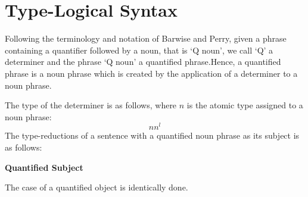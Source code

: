 \section{Type-Logical Syntax}

Following the terminology and notation of Barwise and  Perry, given a phrase containing a quantifier followed by a noun, that is `Q noun', we call `Q' a determiner and the phrase `Q noun' a quantified  phrase.Hence,  a quantified phrase is a noun phrase which is created by the application of a determiner to a noun phrase.  

The type of the determiner is as follows, where $n$ is the atomic type assigned to a noun phrase:
\[
n n^l
\]
The  type-reductions of a sentence with a quantified noun phrase as its  subject is as follows:

\begin{center}
{\bf Quantified Subject}\qquad  {} 
\end{center}

The case of a quantified object is identically done. 


